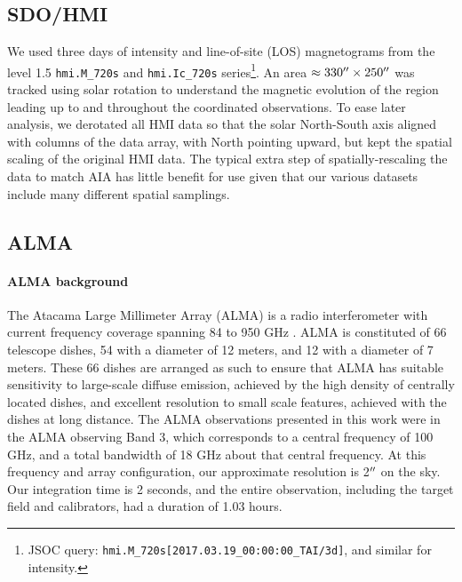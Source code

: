 \documentclass[twocolumn]{aastex62}
\begin{document}
\subsection{SDO/HMI}
We used three days of intensity and line-of-site (LOS) magnetograms from the level 1.5 \texttt{hmi.M\_720s} and \texttt{hmi.Ic\_720s} series\footnote{JSOC query: \texttt{hmi.M\_720s[2017.03.19\_00:00:00\_TAI/3d]}, and similar for intensity.}.  
An area $\approx330\mbox{$^{\prime\prime}$}{}\times250\mbox{$^{\prime\prime}$}{}$ was tracked using solar rotation to understand the magnetic evolution of the region leading up to and throughout the coordinated observations.  
To ease later analysis, we derotated all HMI data so that the solar North-South axis aligned with columns of the data array, with North pointing upward, but kept the spatial scaling of the original HMI data.  
The typical extra step of spatially-rescaling the data to match AIA  has little benefit for use given that our various datasets include many different spatial samplings.

\subsection{ALMA}
\paragraph{ALMA background} The Atacama Large Millimeter Array (ALMA) is a radio interferometer with current frequency coverage spanning 84 to 950 GHz \citep{2009WootenThompson_ALMA}. ALMA is constituted of 66 telescope dishes, 54 with a diameter of 12 meters, and 12 with a diameter of 7 meters. These 66 dishes are arranged as such to ensure that ALMA has suitable sensitivity to large-scale diffuse emission, achieved by the high density of centrally located dishes, and excellent resolution to small scale features, achieved with the dishes at long distance. The ALMA observations presented in this work were in the ALMA observing Band 3, which corresponds to a central frequency of 100 GHz, and a total bandwidth of 18 GHz about that central frequency. At this frequency and array configuration, our approximate resolution is 2$\mbox{$^{\prime\prime}$}$ on the sky. Our integration time is 2 seconds, and the entire observation, including the target field and calibrators, had a duration of 1.03 hours. 
\end{document}
